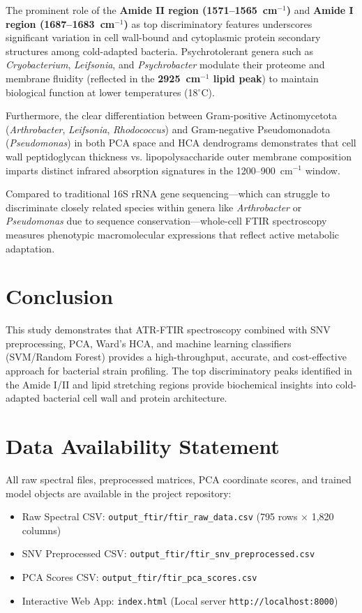 \documentclass[11pt,a4paper]{article}
\begin{document}
The prominent role of the \textbf{Amide II region (1571--1565~cm$^{-1}$)} and \textbf{Amide I region (1687--1683~cm$^{-1}$)} as top discriminatory features underscores significant variation in cell wall-bound and cytoplasmic protein secondary structures among cold-adapted bacteria. Psychrotolerant genera such as \textit{Cryobacterium}, \textit{Leifsonia}, and \textit{Psychrobacter} modulate their proteome and membrane fluidity (reflected in the \textbf{2925~cm$^{-1}$ lipid peak}) to maintain biological function at lower temperatures (18$^\circ$C).

Furthermore, the clear differentiation between Gram-positive Actinomycetota (\textit{Arthrobacter}, \textit{Leifsonia}, \textit{Rhodococcus}) and Gram-negative Pseudomonadota (\textit{Pseudomonas}) in both PCA space and HCA dendrograms demonstrates that cell wall peptidoglycan thickness vs. lipopolysaccharide outer membrane composition imparts distinct infrared absorption signatures in the 1200--900~cm$^{-1}$ window.

Compared to traditional 16S rRNA gene sequencing---which can struggle to discriminate closely related species within genera like \textit{Arthrobacter} or \textit{Pseudomonas} due to sequence conservation---whole-cell FTIR spectroscopy measures phenotypic macromolecular expressions that reflect active metabolic adaptation.

\section{Conclusion}
This study demonstrates that ATR-FTIR spectroscopy combined with SNV preprocessing, PCA, Ward's HCA, and machine learning classifiers (SVM/Random Forest) provides a high-throughput, accurate, and cost-effective approach for bacterial strain profiling. The top discriminatory peaks identified in the Amide I/II and lipid stretching regions provide biochemical insights into cold-adapted bacterial cell wall and protein architecture.

\section*{Data Availability Statement}
All raw spectral files, preprocessed matrices, PCA coordinate scores, and trained model objects are available in the project repository:
\begin{itemize}
    \item Raw Spectral CSV: \texttt{output\_ftir/ftir\_raw\_data.csv} (795 rows $\times$ 1,820 columns)
    \item SNV Preprocessed CSV: \texttt{output\_ftir/ftir\_snv\_preprocessed.csv}
    \item PCA Scores CSV: \texttt{output\_ftir/ftir\_pca_scores.csv}
    \item Interactive Web App: \texttt{index.html} (Local server \texttt{http://localhost:8000})
\end{itemize}
\end{document}
